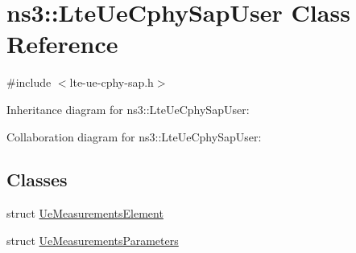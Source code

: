 \hypertarget{classns3_1_1LteUeCphySapUser}{}\section{ns3\+:\+:Lte\+Ue\+Cphy\+Sap\+User Class Reference}
\label{classns3_1_1LteUeCphySapUser}


{\ttfamily \#include $<$lte-\/ue-\/cphy-\/sap.\+h$>$}



Inheritance diagram for ns3\+:\+:Lte\+Ue\+Cphy\+Sap\+User\+:


Collaboration diagram for ns3\+:\+:Lte\+Ue\+Cphy\+Sap\+User\+:
\subsection*{Classes}
\begin{DoxyCompactItemize}
\item 
struct \hyperlink{structns3_1_1LteUeCphySapUser_1_1UeMeasurementsElement}{Ue\+Measurements\+Element}
\item 
struct \hyperlink{structns3_1_1LteUeCphySapUser_1_1UeMeasurementsParameters}{Ue\+Measurements\+Parameters}
\end{DoxyCompactItemize}
